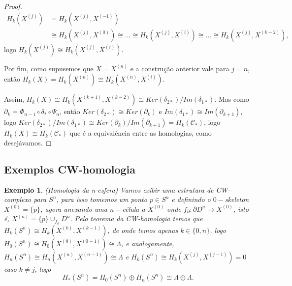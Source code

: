 \documentclass[12pt]{book}
\newtheorem{exemplo}[teorema]{Exemplo}
\newcommand{\celula}[2]{D^{#1}_{#2}}
\newcommand{\celulabordo}[2]{\partial D^{#1}_{#2}}
\newcommand{\homologia}[2]{H_{#1}(#2)}
\newcommand{\homologiarel}[3]{H_{#1}(#2,#3)}
\newcommand{\homologiarelskele}[3]{H_{#1}(X^{(#2)}, X^{(#3)})}
\newcommand{\homologiarelskelesimpl}[2]{H_{#1}(X^{(#2)}, X^{(#2-1)})}
\newcommand{\skeleton}[1]{X^{(#1)}}
\begin{document}
\begin{proof}
		$$
		\begin{aligned}
		\homologia{k}{\skeleton{j}} &= \homologiarel{k}{\skeleton{j}}{\skeleton{-1}} 
		\\
		&\cong  \homologiarel{k}{\skeleton{j}}{\skeleton{0}} \cong \dots \cong  \homologiarel{k}{\skeleton{j}}{\skeleton{i}} \cong  \dots \cong \homologiarel{k}{\skeleton{j}}{\skeleton{k-2}},
		\end{aligned}
		$$
		logo $\homologia{k}{\skeleton{j}} \cong \homologiarel{k}{\skeleton{j}}{\skeleton{i}}$.
		
		Por fim, como supusemos que $X = \skeleton{n}$ e a construção anterior vale para $j = n$, então $\homologia{k}{X} = \homologia{k}{\skeleton{n}} \cong \homologiarelskele{k}{n}{i}$.
		
		Assim, $\homologia{k}{X} \cong \homologiarel{k}{\skeleton{k+1}}{\skeleton{k-2}} \cong Ker(\delta_{2*})/Im(\delta_{1*})$. Mas como $\partial_{k} = \Phi_{n-1}\circ\delta_{*}\circ\Psi_{n}$, então $Ker(\delta_{2*}) \cong Ker(\partial_{k})$ e $Im(\delta_{1*}) \cong Im(\partial_{k+1})$, logo $Ker(\delta_{2*})/Im(\delta_{1*}) \cong Ker(\partial_{k})/Im(\partial_{k+1}) = \homologia{k}{\mathcal{C}_{*}}$, logo $\homologia{k}{X} \cong \homologia{k}{\mathcal{C}_{*}}$ que é a equivalência entre as homologias, como desejávamos.
	\end{proof}
	
	\subsection{Exemplos CW-homologia}
	\begin{exemplo}
		(Homologia da n-esfera)
		Vamos exibir uma estrutura de CW-complexo para $S^{n}$, para isso tomemos um ponto $p \in S^{n}$ e definindo o $0-$skeleton $\skeleton{0}=\{p\}$, agora anexando uma $n-$célula a $\skeleton{0}$ onde $f_{\partial}: \celulabordo{n}{} \to \skeleton{0}$, isto é, $\skeleton{n} = \{p\}\cup_{f_{\partial}} \celula{n}{}$. Pelo teorema da CW-homologia temos que $\homologia{k}{S^{n}} \cong \homologiarelskelesimpl{k}{k}$, de onde temos apenas $k \in \{0,n\}$, logo $\homologia{0}{S^{n}} \cong \homologiarelskelesimpl{0}{0} \cong \Lambda$, e analogamente, $\homologia{n}{S^{n}} \cong \homologiarelskelesimpl{n}{n} \cong \Lambda$ e $\homologia{k}{S^{n}} \cong \homologiarelskelesimpl{k}{j} =0$ caso $k \neq j$, logo
		$$
		\homologia{*}{S^{n}} = \homologia{0}{S^{n}}\oplus\homologia{n}{S^{n}} \cong \Lambda\oplus\Lambda.
		$$
	\end{exemplo}
\end{document}
